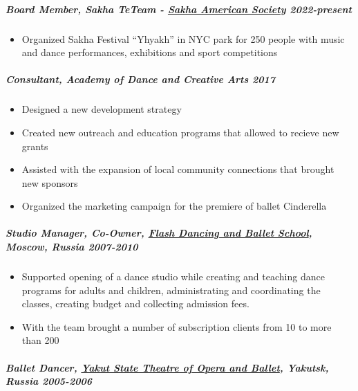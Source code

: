 \documentclass[
  letterpaper,
  DIV=11,
  numbers=noendperiod]{scrartcl}
\let\oldsubparagraph\subparagraph
\renewcommand{\subparagraph}[1]{\oldsubparagraph{#1}\mbox{}}
\providecommand{\tightlist}{%
  \setlength{\itemsep}{0pt}\setlength{\parskip}{0pt}}\usepackage{longtable,booktabs,array}
\begin{document}
\subparagraph{\texorpdfstring{{\textbf{Board Member}}, Sakha TeTeam -
\href{https://www.sakhaopenworld.org/}{Sakha American Society}
{2022-}present}{Board Member, Sakha TeTeam - Sakha American Society 2022-present}}\label{board-member-sakha-teteam---sakha-american-society-2022-present}

\begin{itemize}
\tightlist
\item
  Organized Sakha Festival ``Yhyakh'' in NYC park for 250 people with
  music and dance performances, exhibitions and sport competitions
\end{itemize}

\subparagraph{\texorpdfstring{{Consultant}, Academy of Dance and
Creative Arts
{2017}}{Consultant, Academy of Dance and Creative Arts 2017}}\label{consultant-academy-of-dance-and-creative-arts-2017}

\begin{itemize}
\tightlist
\item
  Designed a new development strategy
\item
  Created new outreach and education programs that allowed to recieve
  new grants
\item
  Assisted with the expansion of local community connections that
  brought new sponsors
\item
  Organized the marketing campaign for the premiere of ballet Cinderella
\end{itemize}

\subparagraph{\texorpdfstring{{Studio Manager, Co-Owner},
\href{https://flash-dancing.ru/}{Flash Dancing and Ballet School},
Moscow, Russia
{2007-2010}}{Studio Manager, Co-Owner, Flash Dancing and Ballet School, Moscow, Russia 2007-2010}}\label{studio-manager-co-owner-flash-dancing-and-ballet-school-moscow-russia-2007-2010}

\begin{itemize}
\tightlist
\item
  Supported opening of a dance studio while creating and teaching dance
  programs for adults and children, administrating and coordinating the
  classes, creating budget and collecting admission fees.
\item
  With the team brought a number of subscription clients from 10 to more
  than 200
\end{itemize}

\subparagraph{\texorpdfstring{{Ballet Dancer},
\href{https://sakha-opera.ru/repertuar/}{Yakut State Theatre of Opera
and Ballet}, Yakutsk, Russia
{2005-2006}}{Ballet Dancer, Yakut State Theatre of Opera and Ballet, Yakutsk, Russia 2005-2006}}\label{ballet-dancer-yakut-state-theatre-of-opera-and-ballet-yakutsk-russia-2005-2006}
\end{document}
